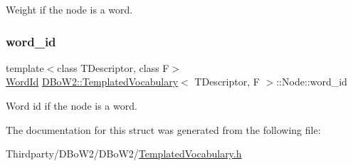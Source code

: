 Weight if the node is a word. 

\mbox{\label{struct_d_bo_w2_1_1_templated_vocabulary_1_1_node_aa56418d848932be4583fac6b3021c708}} 
\subsubsection{\texorpdfstring{word\+\_\+id}{word\_id}}
{\footnotesize\ttfamily template$<$class T\+Descriptor, class F$>$ \\
\mbox{\hyperlink{namespace_d_bo_w2_ab1a0d3283b2d4690a383372ed20bfeb5}{Word\+Id}} \mbox{\hyperlink{class_d_bo_w2_1_1_templated_vocabulary}{D\+Bo\+W2\+::\+Templated\+Vocabulary}}$<$ T\+Descriptor, F $>$\+::Node\+::word\+\_\+id}



Word id if the node is a word. 



The documentation for this struct was generated from the following file\+:\begin{DoxyCompactItemize}
\item 
Thirdparty/\+D\+Bo\+W2/\+D\+Bo\+W2/\mbox{\hyperlink{_templated_vocabulary_8h}{Templated\+Vocabulary.\+h}}\end{DoxyCompactItemize}
